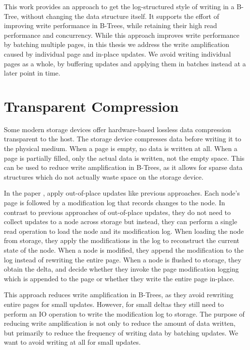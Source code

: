 This work provides an approach to get the log-structured style of writing in a B-Tree, without changing the data structure itself.
It supports the effort of improving write performance in B-Trees, while retaining their high read performance and concurrency.
While this approach improves write performance by batching multiple pages, in this thesis we address the write amplification caused by individual page and in-place updates.
We avoid writing individual pages as a whole, by buffering updates and applying them in batches instead at a later point in time.

\section{Transparent Compression}
Some modern storage devices offer hardware-based lossless data compression transparent to the host.
The storage device compresses data before writing it to the physical medium.
When a page is empty, no data is written at all.
When a page is partially filled, only the actual data is written, not the empty space.
This can be used to reduce write amplification in B-Trees, as it allows for sparse data structures which do not actually waste space on the storage device.

In the paper \cite{qiao2022compression}, apply out-of-place updates like previous approaches.
Each node's page is followed by a modification log that records changes to the node.
In contrast to previous approaches of out-of-place updates, they do not need to collect updates to a node across storage but instead, they can perform a single read operation to load the node and its modification log.
When loading the node from storage, they apply the modifications in the log to reconstruct the current state of the node.
When a node is modified, they append the modification to the log instead of rewriting the entire page.
When a node is flushed to storage, they obtain the delta, and decide whether they invoke the page modification logging which is appended to the page or whether they write the entire page in-place.

This approach reduces write amplification in B-Trees, as they avoid rewriting entire pages for small updates.
However, for small deltas they still need to perform an \ac{IO} operation to write the modification log to storage.
The purpose of reducing write amplification is not only to reduce the amount of data written, but primarily to reduce the frequency of writing data by batching updates.
We want to avoid writing at all for small updates.

